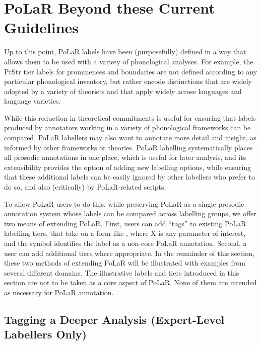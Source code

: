 \documentclass[11pt, twoside]{memoir}
\def\textlabel#1{{\relsize{-.5}\fontspec[Mapping=tex-text]{Roboto Mono}{#1}}}
\begin{document}
\chapter{PoLaR Beyond these Current Guidelines}\label{ch:beyond}
Up to this point, PoLaR labels have been (purposefully) defined in a way that allows them to be used with a variety of phonological analyses. For example, the PrStr tier labels for prominences and boundaries  are not defined according to any particular phonological inventory, but rather encode distinctions that are widely adopted by a variety of theorists and that apply widely across languages and language varieties.

While this reduction in theoretical commitments is useful for ensuring that labels produced by annotators working in a variety of phonological frameworks can be compared, PoLaR labellers may also want to annotate more detail and insight, as informed by other frameworks or theories. PoLaR labelling systematically places all prosodic annotations in one place, which is useful for later analysis, and its extensibility provides the option of adding new labelling options, while ensuring that these additional labels can be easily ignored by other labellers who prefer to do so, and also (critically) by PoLaR-related scripts.

To allow PoLaR users to do this, while preserving PoLaR as a single prosodic annotation system whose labels can be compared across labelling groups, we offer two means of extending PoLaR. First, users can add “tags” to existing PoLaR labelling tiers, that take on a form like \textlabel{\#X}, where X is any parameter of interest, and the \textlabel{\#} symbol identifies the label as a non-core PoLaR annotation. Second, a user can add additional tiers where appropriate. In the remainder of this section, these two methods of extending PoLaR will be illustrated with examples from several different domains. The illustrative labels and tiers introduced in this section are not to be taken as a core aspect of PoLaR. None of them are intended as necessary for PoLaR annotation.

\section{Tagging a Deeper Analysis (Expert-Level Labellers Only)}\label{sec:tagging-a-deeper-analysis-expert-level-labellers-only}
\end{document}
